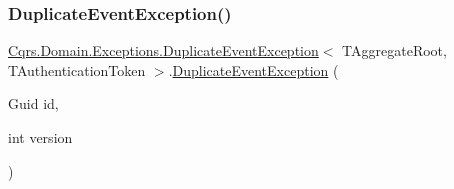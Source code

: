 \subsubsection{\texorpdfstring{Duplicate\+Event\+Exception()}{DuplicateEventException()}}
{\footnotesize\ttfamily \hyperlink{classCqrs_1_1Domain_1_1Exceptions_1_1DuplicateEventException}{Cqrs.\+Domain.\+Exceptions.\+Duplicate\+Event\+Exception}$<$ T\+Aggregate\+Root, T\+Authentication\+Token $>$.\hyperlink{classCqrs_1_1Domain_1_1Exceptions_1_1DuplicateEventException}{Duplicate\+Event\+Exception} (\begin{DoxyParamCaption}\item[{Guid}]{id,  }\item[{int}]{version }\end{DoxyParamCaption})}

